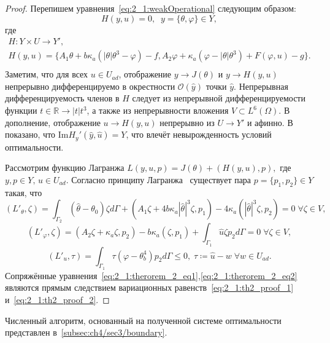 \begin{proof}
    Перепишем уравнения~\eqref{eq:2_1:weakOperational} следующим образом:
    \[ H(y,u) = 0,\;\; y = \{\theta,\varphi\} \in Y, \]
    где
    \begin{gather*}
        H:Y \times U \to Y',\\
        H(y,u) =\{A_1 \theta + b \kappa_a (| \theta | \theta^3 - \varphi ) - f,
        A_2 \varphi + \kappa_a (\varphi - |\theta|\theta^3) + F(\varphi, u) - g \}.\\
    \end{gather*}
    Заметим, что для всех $u \in U_{ad}$, отображение
    $y \to J(\theta) $ и $y \to H(y,u)$ непрерывно
    дифференцируемо в окрестности $\mathcal{O}(\hat{y})$ точки $\hat{y}$.
    Непрерывная дифференцируемость членов в $H$ следует из непрерывной дифференцируемости
    функции $t \in \mathbb{R} \to | t | t^3$,
    а также из непрерывности вложения  $V \subset L^6(\Omega)$.
    В дополнение, отображение $u \to H(y,u)$ непрерывно из $U \to Y'$ и афинно.
    В~\cite{Kovtanyuk2014TheoreticalAnalysis} показано,
    что $\text{Im}H_y'(\hat{y}, \hat{u}) = Y$,
    что влечёт невырожденность условий оптимальности.

    Рассмотрим функцию Лагранжа
    $L(y,u,p) = J(\theta) + (H(y,u),p),$ где $y,p \in Y,\, u \in U_{ad}$.
    Согласно принципу Лагранжа~\cite[Гл.2, теорема 1.5]{11}
    существует пара $p = \{p_1,p_2\} \in Y$ такая, что
    \begin{equation}
        \label{eq:2_1:th2_proof_1}
        (L'_\theta,\zeta) =\int_{\Gamma_2}(\hat\theta -\theta_0) \zeta d\Gamma
        + (A_1 \zeta + 4b\kappa_a |\hat\theta|^3 \zeta,p_1)
        - 4\kappa_a(|\hat\theta|^3 \zeta,p_2) = 0 \; \forall \zeta \in V,
    \end{equation}
    \begin{equation}
        \label{eq:2_1:th2_proof_2}
        (L'_\varphi, \zeta) = (A_2 \zeta + \kappa_a \zeta, p_2)
        - b \kappa_a(\zeta,p_1)
        + \int_{\Gamma_1} \hat u \zeta p_2 d\Gamma = 0 \; \forall \zeta \in V,
    \end{equation}
    \begin{equation}
        \label{eq:2_1:th2_proof_3}
        (L'_u,\tau) = \int_{\Gamma_1} \tau (\varphi - \theta^4_b) p_2 d\Gamma  \leq 0,
        \; \tau \coloneqq \hat u - w \; \forall w \in U_{ad}.
    \end{equation}
    Сопряжённые уравнения~\eqref{eq:2_1:therorem_2_eq1},\eqref{eq:2_1:therorem_2_eq2}
    являются прямым следствием
    вариационных равенств~\eqref{eq:2_1:th2_proof_1} и~\eqref{eq:2_1:th2_proof_2}.
\end{proof}

Численный алгоритм, основанный на полученной системе
оптимальности представлен в~\ref{subsec:ch4/sec3/boundary}.
\FloatBarrier
